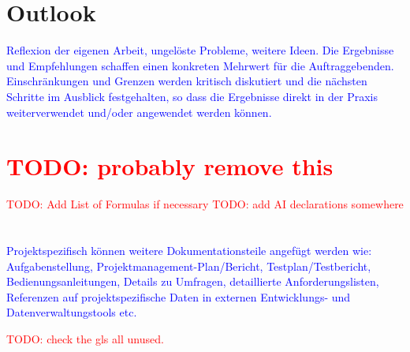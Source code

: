 \documentclass[12pt, a4paper, oneside]{book}   	%
\renewcommand{\todo}[1]{\textcolor{red}{TODO: #1}}
\newcommand{\baaCriteria}[1]{\textcolor{blue}{#1}}
\begin{document}
	\chapter{Outlook}
		\baaCriteria{Reflexion der eigenen Arbeit, ungelöste Probleme, weitere Ideen.}
		\baaCriteria{Die Ergebnisse und Empfehlungen schaffen einen konkreten Mehrwert für die Auftraggebenden. Einschränkungen und Grenzen werden kritisch diskutiert und die nächsten Schritte im Ausblick festgehalten, so dass die Ergebnisse direkt in der Praxis weiterverwendet und/oder angewendet werden können.}
		
		\newpage




	\chapter{\glossaryname \todo{probably remove this}}
	\todo{Add List of Formulas if necessary}
	\todo{add AI declarations somewhere}
	
	
	\chapter{\bibname}
		\printbibliography[heading=none]
		
		
		
		\appendix
			\baaCriteria{Projektspezifisch können weitere Dokumentationsteile angefügt werden wie: Aufgabenstellung, Projektmanagement-Plan/Bericht, Testplan/Testbericht, Bedienungsanleitungen, Details zu Umfragen, detaillierte Anforderungslisten, Referenzen auf projektspezifische Daten in externen Entwicklungs- und Datenverwaltungstools etc.}
			
		\glsaddallunused                                %
		\todo{check the gls all unused.}
	
\end{document}
